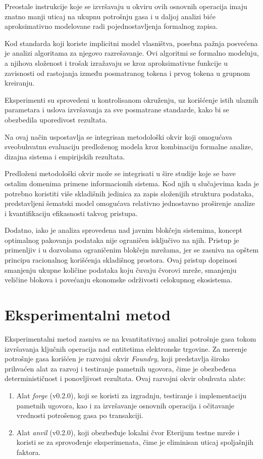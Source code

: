 \begin{description}
Preostale instrukcije koje se izvršavaju u okviru ovih osnovnih operacija imaju znatno manji uticaj na ukupnu potrošnju gasa i u daljoj analizi biće aproksimativno modelovane radi pojednostavljenja formalnog zapisa.

Kod standarda koji koriste implicitni model vlasništva, posebna pažnja posvećena je analizi algoritama za njegovo razrešavanje. Ovi algoritmi se formalno modeluju, a njihova složenost i trošak izražavaju se kroz aproksimativne funkcije u zavisnosti od rastojanja između posmatranog tokena i prvog tokena u grupnom kreiranju.
\end{description}

Eksperimenti su sprovedeni u kontrolisanom okruženju, uz korišćenje istih ulaznih parametara i uslova izvršavanja za sve posmatrane standarde, kako bi se obezbedila uporedivost rezultata.

Na ovaj način uspostavlja se integrisan metodološki okvir koji omogućava sveobuhvatnu evaluaciju predloženog modela kroz kombinaciju formalne analize, dizajna sistema i empirijskih rezultata.

Predloženi metodološki okvir može se integrisati u šire studije koje se bave ostalim domenima primene informacionih sistema. Kod njih u slučajevima kada je potrebno koristiti više skladišnih jedinica za zapis složenijih struktura podataka, predstavljeni šematski model omogućava relativno jednostavno proširenje analize i kvantifikaciju efikasnosti takvog pristupa.

Dodatno, iako je analiza sprovedena nad javnim blokčejn sistemima, koncept optimalnog pakovanja podataka nije ograničen isključivo na njih. Pristup je primenljiv i u dozvolama ograničenim blokčejn mrežama, jer se zasniva na opštem principu racionalnog korišćenja skladišnog prostora. Ovaj pristup doprinosi smanjenju ukupne količine podataka koju čuvaju čvorovi mreže, smanjenju veličine blokova i povećanju ekonomske održivosti celokupnog ekosistema.

\section{Eksperimentalni metod}
Eksperimentalni metod zasniva se na kvantitativnoj analizi potrošnje gasa tokom izvršavanja ključnih operacija nad entitetima elektronske trgovine. Za merenje potrošnje gasa korišćen je razvojni okvir \textit{Foundry}, koji predstavlja široko prihvaćen alat za razvoj i testiranje pametnih ugovora, čime je obezbeđena determinističnost i ponovljivost rezultata. Ovaj razvojni okvir obuhvata alate:
\begin{enumerate}
\item Alat \textit{forge} (v0.2.0), koji se koristi za izgradnju, testiranje i implementaciju pametnih ugovora, kao i za izvršavanje osnovnih operacija i očitavanje vrednosti potrošenog gasa po transakciji.
\item Alat \textit{anvil} (v0.2.0), koji obezbeđuje lokalni čvor Eterijum testne mreže i koristi se za sprovođenje eksperimenata, čime je eliminisan uticaj spoljašnjih faktora.
\end{enumerate}


